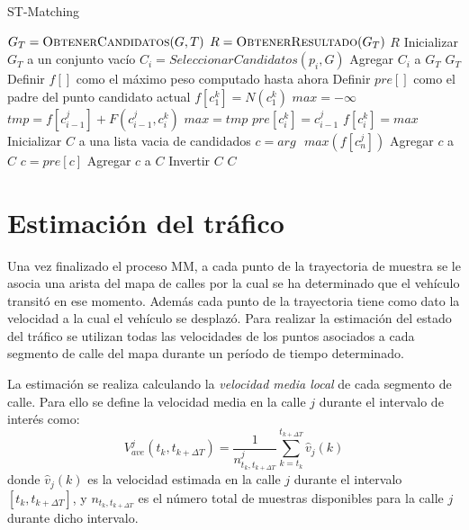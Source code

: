 \begin{algorithm}
\caption{ST-Matching}
\label{alg:st_matching}
\begin{algorithmic}[1]
	\State $G_T = \Call{ObtenerCandidatos}{G,T}$
	\State $R = \Call{ObtenerResultado}{G_T}$
	\State \Return $R$
\EndProcedure
\Statex
{}
	\State Inicializar $G_T$ a un conjunto vacío
		\State $C_i = SeleccionarCandidatos(p_i, G)$
		\State Agregar $C_i$ a $G_T$
	\EndFor
	\State \Return $G_T$
\EndFunction
\Statex
{}
	\State Definir $f[]$ como el máximo peso computado hasta ahora
	\State Definir $pre[]$ como el padre del punto candidato actual
		\State $f[c_1^k] = N(c_1^k)$
	\EndFor
			\State $max = -\infty$
				\State $tmp = f[c_{i-1}^j] + F(c_{i-1}^j,c_i^k)$
					\State $max = tmp$
					\State $pre[c_i^k] = c_{i-1}^j$
				\EndIf
				\State $f[c_i^k] = max$
			\EndFor
		\EndFor
	\EndFor
	\State Inicializar $C$ a una lista vacia de candidados
	\State $c = arg \text{ } max(f[c_n^j])$
		\State Agregar $c$ a $C$
		\State $c = pre[c]$
	\EndFor
	\State Agregar $c$ a $C$
	\State Invertir $C$
	\State \Return $C$
\EndFunction
\end{algorithmic}
\end{algorithm}

\section{Estimación del tráfico}
\label{estimacion_trafico}

Una vez finalizado el proceso MM, a cada punto de la trayectoria de muestra se le asocia una arista del mapa de calles por la cual se ha determinado que el vehículo transitó en ese momento. Además cada punto de la trayectoria tiene como dato la velocidad a la cual el vehículo se desplazó. Para realizar la estimación del estado del tráfico se utilizan todas las velocidades de los puntos asociados a cada segmento de calle del mapa durante un período de tiempo determinado.

La estimación se realiza calculando la \emph{velocidad media local} de cada segmento de calle. Para ello se define la velocidad media en la calle $j$ durante el intervalo de interés como:
\begin{equation}
\label{eq:velocidad_media}
{ V }_{ ave }^{ j }({ t }_{ k },{ t }_{ k+\Delta T })=\frac { 1 }{ { n }_{ { t }_{ k },{ t }_{ k+\Delta T } }^{ j } } \sum_{ k={ t }_{ k } }^{ { t }_{ k+\Delta T } }{ \hat { { v } } _{ j }(k) }
\end{equation}
donde ${ \hat { { v } } _{ j }(k) }$ es la velocidad estimada en la calle $j$ durante el intervalo $\left[ { t }_{ k },{ t }_{ k+\Delta T } \right] $, y ${ { n }_{ { t }_{ k },{ t }_{ k+\Delta T }}}$ es el número total de muestras disponibles para la calle $j$ durante dicho intervalo.

